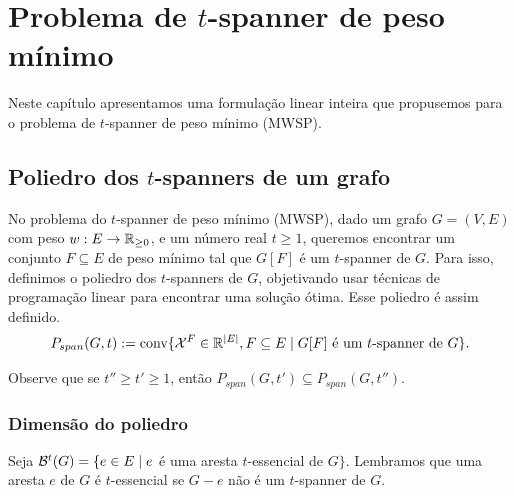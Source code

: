 
\chapter{Problema de $t$-spanner de peso mínimo}
\label{cap:mwsp}

Neste capítulo apresentamos uma formulação linear inteira que
propusemos para o problema de $t$-spanner de peso mínimo (MWSP).


\section{Poliedro dos $t$-spanners de um grafo}

No problema do $t$-spanner de peso mínimo (MWSP), dado um grafo
$G=(V,E)$ com peso \hbox{$w: E \to \mathbb{R}_{\ge 0}$,} e um número real
$t \ge 1$, queremos encontrar um conjunto $F \subseteq E$ de peso
mínimo tal que $G[F]$ é um $t$-spanner de $G$.  Para isso, definimos o
poliedro dos $t$-spanners de $G$, objetivando usar técnicas de
programação linear para encontrar uma solução ótima. Esse poliedro é
assim definido.
%
\begin{equation*}
\begin{split}
P_{span}(G,t) := \text{conv}\{\mathcal{X}^{F} \in \mathbb{R}^{|E|}, F \subseteq E\; |\; \text{$G[F]$ é um $t$-spanner de $G$\}}. 
\end{split}
\end{equation*}

Observe que se $t'' \ge t' \ge 1$, então $P_{span}(G,t') \subseteq P_{span}(G,t'')$.


\smallskip

\subsection{Dimensão do poliedro}
\label{sec:dim_poliedro}

Seja $\mathcal{B}^{t}(G) = \{e \in E\; |\; e$ é uma aresta $t$-essencial de $G\}$. Lembramos que uma aresta $e$ de $G$ 
é $t$-essencial se $G-e$ não é um $t$-spanner de $G$. 


